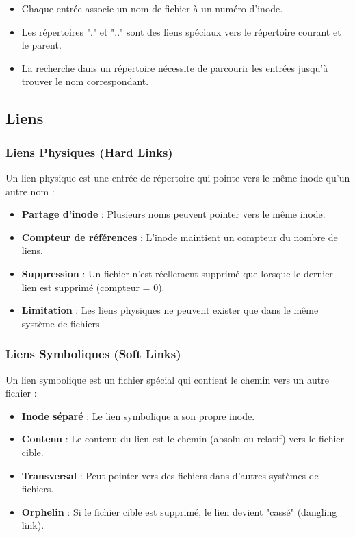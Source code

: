 \documentclass[12pt,a4paper]{article}
\begin{document}
\begin{itemize}
    \item Chaque entrée associe un nom de fichier à un numéro d'inode.
    \item Les répertoires "." et ".." sont des liens spéciaux vers le répertoire courant et le parent.
    \item La recherche dans un répertoire nécessite de parcourir les entrées jusqu'à trouver le nom correspondant.
\end{itemize}

\subsection{Liens}

\subsubsection{Liens Physiques (Hard Links)}

Un lien physique est une entrée de répertoire qui pointe vers le même inode qu'un autre nom :

\begin{itemize}
    \item \textbf{Partage d'inode} : Plusieurs noms peuvent pointer vers le même inode.
    \item \textbf{Compteur de références} : L'inode maintient un compteur du nombre de liens.
    \item \textbf{Suppression} : Un fichier n'est réellement supprimé que lorsque le dernier lien est supprimé (compteur = 0).
    \item \textbf{Limitation} : Les liens physiques ne peuvent exister que dans le même système de fichiers.
\end{itemize}

\subsubsection{Liens Symboliques (Soft Links)}

Un lien symbolique est un fichier spécial qui contient le chemin vers un autre fichier :

\begin{itemize}
    \item \textbf{Inode séparé} : Le lien symbolique a son propre inode.
    \item \textbf{Contenu} : Le contenu du lien est le chemin (absolu ou relatif) vers le fichier cible.
    \item \textbf{Transversal} : Peut pointer vers des fichiers dans d'autres systèmes de fichiers.
    \item \textbf{Orphelin} : Si le fichier cible est supprimé, le lien devient "cassé" (dangling link).
\end{itemize}
\end{document}
